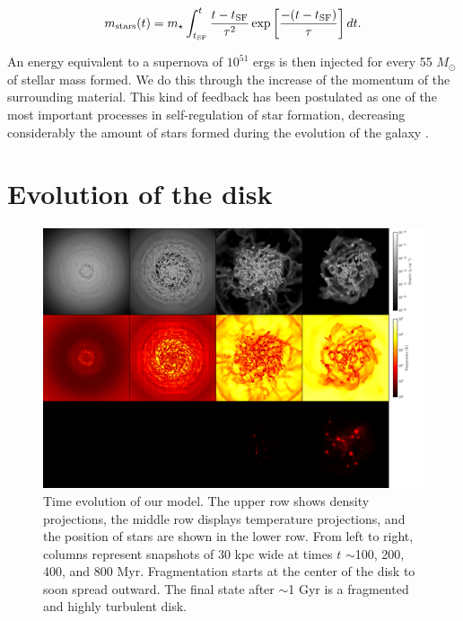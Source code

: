 \documentclass[twocolumn]{aastex}
\newcommand{\msun}{M_\odot}
\newcommand{\mstar}{m_\star}
\begin{document}
	\begin{equation}
	m_{\rm stars}(t)=\mstar \int_{t_{\rm SF}}^t \frac{t-t_{\rm SF}}{\tau^2}\exp\left[\frac{-(t-t_{\rm SF})}{\tau}\right]dt.
	\end{equation}

An energy equivalent to a supernova of $10^{51}$ ergs is then injected for every 55 $\msun$ of stellar mass formed. We do this through the increase of the momentum of the surrounding material. This kind of feedback has been postulated as one of the most important processes in self-regulation of star formation, decreasing considerably the amount of stars formed during the evolution of the galaxy \citep{Tasker_Bryan_06, Hummels_12, Hopkins_13}.

\section{Evolution of the disk}
\label{sec:evolution}

	\begin{figure}[h!]
	\begin{center}
	\includegraphics[scale=0.38]{./f1.png}
	\caption{Time evolution of our model. The upper row shows density projections, the middle row displays temperature projections, and the position of stars are shown in the lower row. From left to right, columns represent snapshots of 30 kpc wide at times $t$ $\sim$100, 200, 400, and 800 Myr. Fragmentation starts at the center of the disk to soon spread outward. The final state after $\sim$1 Gyr is a fragmented and highly turbulent disk.}
	\label{fig:evolution}
	\end{center}
	\end{figure}
	
\end{document}
